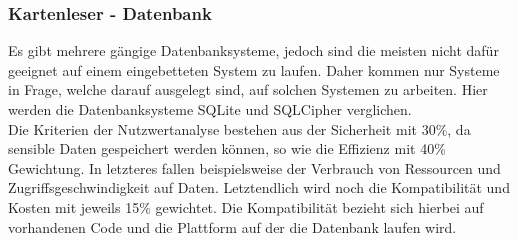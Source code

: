 \subsubsection{Kartenleser - Datenbank}
Es gibt mehrere gängige Datenbanksysteme, jedoch sind die meisten nicht dafür geeignet auf einem eingebetteten System zu laufen. Daher kommen nur Systeme in Frage, welche darauf ausgelegt sind, auf solchen Systemen zu arbeiten. Hier werden die Datenbanksysteme SQLite und SQLCipher verglichen.\vspace{0.2cm}\\
Die Kriterien der Nutzwertanalyse bestehen aus der Sicherheit mit 30\%, da sensible Daten gespeichert werden können, so wie die Effizienz mit 40\% Gewichtung. In letzteres fallen beispielsweise der Verbrauch von Ressourcen und Zugriffsgeschwindigkeit auf Daten. Letztendlich wird noch die Kompatibilität und Kosten mit jeweils 15\% gewichtet. Die Kompatibilität bezieht sich hierbei auf vorhandenen Code und die Plattform auf der die Datenbank laufen wird.\\
